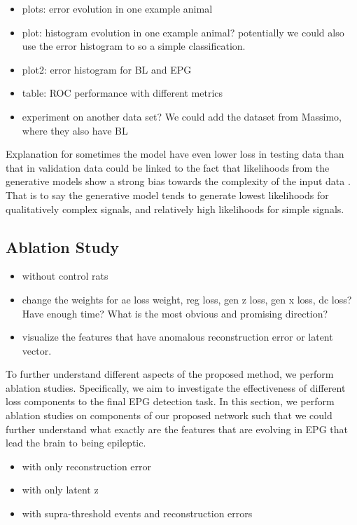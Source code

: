 \documentclass[pmlr]{jmlr}%
\begin{document}
\begin{itemize}
	\item plots: error evolution in one example animal
	\item plot: histogram evolution in one example animal? potentially we could also use the error histogram to so a simple classification.
	\item plot2: error histogram for BL and EPG
	\item table: ROC performance with different metrics
	\item experiment on another data set? We could add the dataset from Massimo, where they also have BL
\end{itemize}

Explanation for sometimes the model have even lower loss in testing data than that in validation data could be linked to the fact that likelihoods from the generative models show a strong bias towards the complexity of the input data \cite{serra2019input, schirrmeister2020understanding, ren2019likelihood}. That is to say the generative model tends to generate lowest likelihoods for qualitatively complex signals, and relatively high likelihoods for simple signals.


\subsection{Ablation Study}
\begin{itemize}
	\item without control rats
	\item change the weights for ae loss weight, reg loss, gen z loss, gen x loss, dc loss? Have enough time? What is the most obvious and promising direction?
	\item visualize the features that have anomalous reconstruction error or latent vector.
\end{itemize}


To further understand different aspects of the proposed method, we perform ablation studies. Specifically, we aim to investigate the effectiveness of different loss components to the final EPG detection task. In this section, we perform ablation studies on components of our proposed network such that we could further understand what exactly are the features that are evolving in EPG that lead the brain to being epileptic.
\begin{itemize}
	\item with only reconstruction error
	\item with only latent z
	\item with supra-threshold events and reconstruction errors
\end{itemize}
\end{document}
